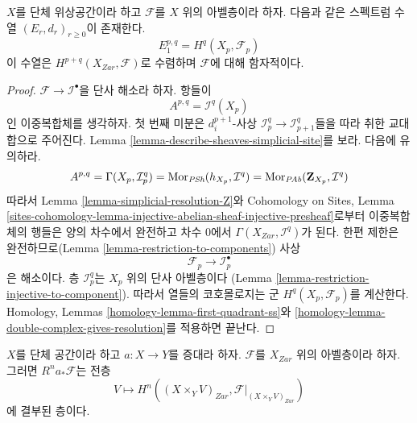 \begin{lemma}
\label{lemma-simplicial-sheaf-cohomology}
$X$를 단체 위상공간이라 하고 $\mathcal{F}$를 $X$ 위의 아벨층이라 하자.
다음과 같은 스펙트럼 수열 $(E_r, d_r)_{r \geq 0}$이 존재한다.
$$
E_1^{p, q} = H^q(X_p, \mathcal{F}_p)
$$
이 수열은 $H^{p + q}(X_{Zar}, \mathcal{F})$로 수렴하며
$\mathcal{F}$에 대해 함자적이다.
\end{lemma}

\begin{proof}
$\mathcal{F} \to \mathcal{I}^\bullet$을 단사 해소라 하자.
항들이
$$
A^{p, q} = \mathcal{I}^q(X_p)
$$
인 이중복합체를 생각하자. 첫 번째 미분은
$d^{p + 1}_i$-사상 $\mathcal{I}_p^q \to \mathcal{I}_{p + 1}^q$들을
따라 취한 교대합으로 주어진다. Lemma
\ref{lemma-describe-sheaves-simplicial-site}를 보라. 다음에 유의하라.
$$
A^{p, q} = \Gamma(X_p, \mathcal{I}_p^q) =
\mathop{\mathrm{Mor}}\nolimits_{\textit{PSh}}(h_{X_p}, \mathcal{I}^q) =
\mathop{\mathrm{Mor}}\nolimits_{\textit{PAb}}(\mathbf{Z}_{X_p}, \mathcal{I}^q)
$$
따라서 Lemma \ref{lemma-simplicial-resolution-Z}와
Cohomology on Sites, Lemma
\ref{sites-cohomology-lemma-injective-abelian-sheaf-injective-presheaf}로부터
이중복합체의 행들은 양의 차수에서 완전하고 차수 $0$에서
$\Gamma(X_{Zar}, \mathcal{I}^q)$가 된다.
한편 제한은 완전하므로(Lemma \ref{lemma-restriction-to-components})
사상
$$
\mathcal{F}_p \to \mathcal{I}_p^\bullet
$$
은 해소이다. 층 $\mathcal{I}_p^q$는 $X_p$ 위의 단사 아벨층이다
(Lemma \ref{lemma-restriction-injective-to-component}).
따라서 열들의 코호몰로지는 군 $H^q(X_p, \mathcal{F}_p)$를 계산한다.
Homology, Lemmas \ref{homology-lemma-first-quadrant-ss}와
\ref{homology-lemma-double-complex-gives-resolution}를 적용하면 끝난다.
\end{proof}

\begin{lemma}
\label{lemma-augmentation-pushforward-higher-direct-image}
$X$를 단체 공간이라 하고 $a : X \to Y$를 증대라 하자.
$\mathcal{F}$를 $X_{Zar}$ 위의 아벨층이라 하자.
그러면 $R^na_*\mathcal{F}$는 전층
$$
V \longmapsto H^n((X \times_Y V)_{Zar}, \mathcal{F}|_{(X \times_Y V)_{Zar}})
$$
에 결부된 층이다.
\end{lemma}

